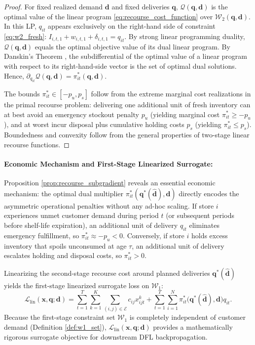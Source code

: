 \documentclass[11pt,a4paper]{article}
\theoremstyle{definition}
\theoremstyle{remark}
\begin{document}
\begin{proof}
For fixed realized demand $\mathbf{d}$ and fixed deliveries $\mathbf{q}$, $\mathcal{Q}(\mathbf{q}, \mathbf{d})$ is the optimal value of the linear program \eqref{eq:recourse_cost_function} over $\mathcal{W}_2(\mathbf{q}, \mathbf{d})$. In this LP, $q_{it}$ appears exclusively on the right-hand side of constraint \eqref{eq:w2_fresh}: $I_{i,t,1} + w_{i,t,1} + \delta_{i,t,1} = q_{it}$. By strong linear programming duality, $\mathcal{Q}(\mathbf{q}, \mathbf{d})$ equals the optimal objective value of its dual linear program. By Danskin's Theorem \citep{bertsekas1999nonlinear}, the subdifferential of the optimal value of a linear program with respect to its right-hand-side vector is the set of optimal dual solutions. Hence, $\partial_{q_{it}} \mathcal{Q}(\mathbf{q}, \mathbf{d}) = \pi_{it}^*(\mathbf{q}, \mathbf{d})$. 

The bounds $\pi_{it}^* \in [-p_u, p_s]$ follow from the extreme marginal cost realizations in the primal recourse problem: delivering one additional unit of fresh inventory can at best avoid an emergency stockout penalty $p_u$ (yielding marginal cost $\pi_{it}^* \ge -p_u$), and at worst incur disposal plus cumulative holding costs $p_s$ (yielding $\pi_{it}^* \le p_s$). Boundedness and convexity follow from the general properties of two-stage linear recourse functions.
\end{proof}

\paragraph{Economic Mechanism and First-Stage Linearized Surrogate:}
Proposition \ref{prop:recourse_subgradient} reveals an essential economic mechanism: the optimal dual multiplier $\pi_{it}^*(\mathbf{q}^*(\hat{\mathbf{d}}), \mathbf{d})$ directly encodes the asymmetric operational penalties without any ad-hoc scaling. If store $i$ experiences unmet customer demand during period $t$ (or subsequent periods before shelf-life expiration), an additional unit of delivery $q_{it}$ eliminates emergency fulfillment, so $\pi_{it}^* \approx -p_u < 0$. Conversely, if store $i$ holds excess inventory that spoils unconsumed at age $\tau$, an additional unit of delivery escalates holding and disposal costs, so $\pi_{it}^* > 0$.

Linearizing the second-stage recourse cost around planned deliveries $\mathbf{q}^*(\hat{\mathbf{d}})$ yields the first-stage linearized surrogate loss on $\mathcal{W}_1$:
\begin{equation*}
    \mathcal{L}_{\text{lin}}(\mathbf{x}, \mathbf{q}; \mathbf{d}) = \sum_{t=1}^T \sum_{k=1}^K \sum_{(i,j) \in \mathcal{E}} c_{ij} x_{ijt}^k + \sum_{t=1}^T \sum_{i=1}^N \pi_{it}^*\big(\mathbf{q}^*(\hat{\mathbf{d}}), \mathbf{d}\big) q_{it}.
\end{equation*}
Because the first-stage constraint set $\mathcal{W}_1$ is completely independent of customer demand (Definition \ref{def:w1_set}), $\mathcal{L}_{\text{lin}}(\mathbf{x}, \mathbf{q}; \mathbf{d})$ provides a mathematically rigorous surrogate objective for downstream DFL backpropagation.
\end{document}
